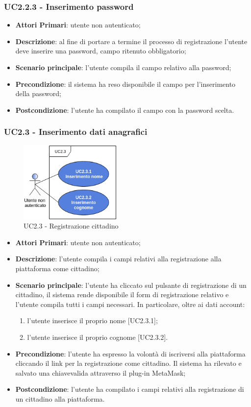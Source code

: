 \subsubsection{UC2.2.3 - Inserimento password}
\begin{itemize}
	\item \textbf{Attori Primari}: utente non autenticato;
	\item \textbf{Descrizione}: al fine di portare a termine il processo di registrazione l'utente deve inserire una password, campo ritenuto obbligatorio;
	\item \textbf{Scenario principale}: l'utente compila il campo relativo alla password;
	\item \textbf{Precondizione}: il sistema ha reso disponibile il campo per l'inserimento della password;
	\item \textbf{Postcondizione}: l'utente ha compilato il campo con la password scelta.
\end{itemize}
\subsubsection{UC2.3 - Inserimento dati anagrafici}
\begin{figure}[h]
	\includegraphics[width=5cm]{res/images/UC2-3Registrazione-cliente.png}
	\centering
	\caption{UC2.3 - Registrazione cittadino}
\end{figure}
\begin{itemize}
	\item \textbf{Attori Primari}: utente non autenticato;
	\item \textbf{Descrizione}: l'utente compila i campi relativi alla registrazione alla piattaforma come cittadino;
	\item \textbf{Scenario principale}: l'utente ha cliccato sul pulsante di registrazione di un cittadino, il sistema rende disponibile il form di registrazione relativo e l'utente compila tutti i campi necessari. In particolare, oltre ai dati account:
	\begin{enumerate}[label=\alph*.]
		\item l'utente inserisce il proprio nome [UC2.3.1];
		\item l'utente inserisce il proprio cognome [UC2.3.2].
	\end{enumerate}
	\item \textbf{Precondizione}: l'utente ha espresso la volontà di iscriversi alla piattaforma cliccando il link per la registrazione come cittadino. Il sistema ha rilevato e salvato una chiave\glosp valida attraverso il plug-in MetaMask\glo;
	\item \textbf{Postcondizione}: l'utente ha compilato i campi relativi alla registrazione di un cittadino alla piattaforma.
\end{itemize}
